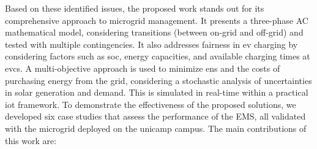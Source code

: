 \documentclass[preprint, 12pt, 3p]{elsarticle}
\begin{document}
Based on these identified issues, the proposed work stands out 
for its comprehensive approach to microgrid management. 
It presents a three-phase AC mathematical model, considering transitions 
(between on-grid and off-grid) and tested with multiple contingencies. It 
also addresses fairness in \gls{ev} 
charging by considering factors such as \gls{soc}, energy capacities, and 
available charging times at \gls{evcs}. A multi-objective approach is used 
to minimize \gls{ens} and the costs of purchasing energy from the grid, considering 
a stochastic analysis of uncertainties in solar generation and demand. 
This is simulated in real-time within a practical \gls{iot} framework.
%
To demonstrate the effectiveness of the proposed solutions, we developed 
six case studies that assess the performance of the EMS, all validated with 
the microgrid deployed on the \gls{unicamp} \gls{campus}. 
The main contributions of this work are:
\end{document}
